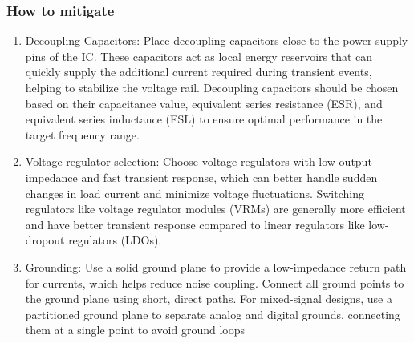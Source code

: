 \documentclass[10pt,hyperref={pdfpagemode=FullScreen},aspectratio=169]{beamer}
\begin{document}
\begin{frame}
  \frametitle{How to mitigate}

\begin{enumerate}
  \item Decoupling Capacitors:
  Place decoupling capacitors close to the power supply pins of the IC. These capacitors act as local energy reservoirs that can quickly supply the additional current required during transient events, helping to stabilize the voltage rail. Decoupling capacitors should be chosen based on their capacitance value, equivalent series resistance (ESR), and equivalent series inductance (ESL) to ensure optimal performance in the target frequency range.
  \item Voltage regulator selection:
  Choose voltage regulators with low output impedance and fast transient response, which can better handle sudden changes in load current and minimize voltage fluctuations. Switching regulators like voltage regulator modules (VRMs) are generally more efficient and have better transient response compared to linear regulators like low-dropout regulators (LDOs).
  \item Grounding:
  Use a solid ground plane to provide a low-impedance return path for currents, which helps reduce noise coupling. Connect all ground points to the ground plane using short, direct paths. For mixed-signal designs, use a partitioned ground plane to separate analog and digital grounds, connecting them at a single point to avoid ground loops
\end{enumerate}


\end{frame}
\end{document}

